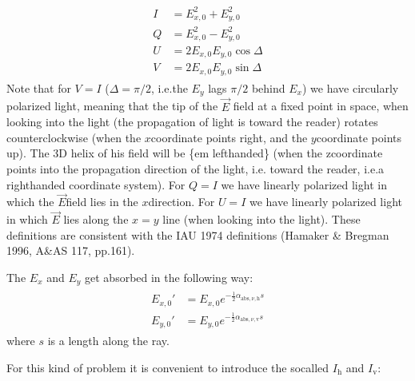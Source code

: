 \documentclass[letterpaper,10pt,english]{sphinxmanual}
\begin{document}
\label{\detokenize{dustradtrans:eq-def-stokes-iquv}}\begin{equation*}
\begin{split}\begin{split}
I &= E_{x,0}^2+E_{y,0}^2\\
Q &= E_{x,0}^2-E_{y,0}^2\\
U &= 2E_{x,0}E_{y,0}\cos\Delta\\
V &= 2E_{x,0}E_{y,0}\sin\Delta
\end{split}\end{split}
\end{equation*}
Note that for \(V=I\) (\(\Delta=\pi/2\), i.e.the \(E_y\) lags
\(\pi/2\) behind \(E_x\)) we have  circularly polarized
light, meaning that the tip of the \(\vec E\) field at a fixed point in
space, when looking into the light (the propagation of light is toward the
reader) rotates counter\sphinxhyphen{}clockwise (when the \(x\)\sphinxhyphen{}coordinate points right,
and the \(y\)\sphinxhyphen{}coordinate points up). The 3\sphinxhyphen{}D helix of his field will be \{em
left\sphinxhyphen{}handed\} (when the z\sphinxhyphen{}coordinate points into the propagation direction of the
light, i.e. toward the reader, i.e.a right\sphinxhyphen{}handed coordinate system). For
\(Q=I\) we have linearly polarized light in which the \(\vec E\)\sphinxhyphen{}field
lies in the \(x\)\sphinxhyphen{}direction. For \(U=I\) we have linearly polarized
light in which \(\vec E\) lies along the \(x=y\) line (when looking into
the light). These definitions are consistent with the IAU 1974 definitions
(Hamaker \& Bregman 1996, A\&AS 117, pp.161).

The \(E_x\) and \(E_y\) get absorbed in the following way:
\begin{equation*}
\begin{split}\begin{split}
E_{x,0}' &= E_{x,0} e^{-\tfrac{1}{2}\alpha_{\mathrm{abs},\nu,\mathrm{h}}s}\\
E_{y,0}' &= E_{y,0} e^{-\tfrac{1}{2}\alpha_{\mathrm{abs},\nu,\mathrm{v}}s}
\end{split}\end{split}
\end{equation*}
where \(s\) is a length along the ray.

For this kind of problem it is convenient to introduce the so\sphinxhyphen{}called  \(I_{\mathrm{h}}\) and \(I_{\mathrm{v}}\):
\end{document}
